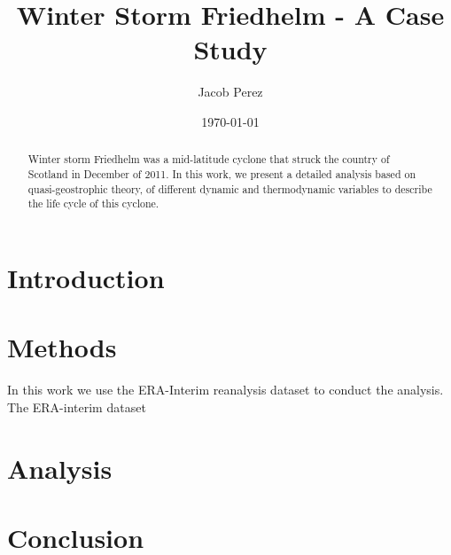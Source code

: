 \documentclass[12pt,a4paper]{article}
\title{\textbf{Winter Storm Friedhelm} - A Case Study}
\date{\today}
\author{Jacob Perez}
\begin{document}
\maketitle
\begin{abstract}
    Winter storm Friedhelm was a mid-latitude cyclone that struck the country of Scotland in December of 2011. In this work, we present a detailed analysis based on quasi-geostrophic theory, of different dynamic and thermodynamic variables to describe the life cycle of this cyclone. 
\end{abstract}
\tableofcontents
\section{Introduction}
\section{Methods}
In this work we use the ERA-Interim reanalysis dataset to conduct the analysis. The ERA-interim dataset 
\section{Analysis}
\section{Conclusion}


\end{document}

